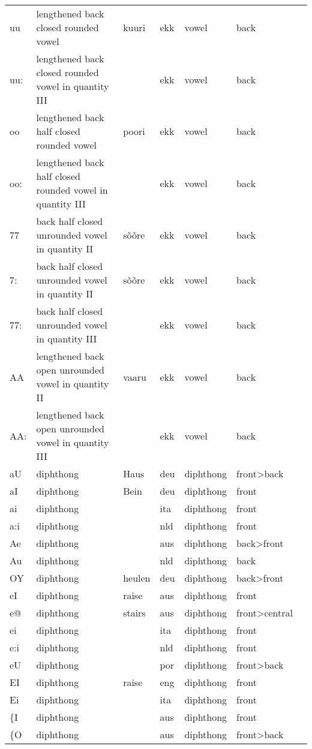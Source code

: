 \begin{longtable}{l|p{.3\linewidth}|p{.15\linewidth}|l|l|l|l}
	uu	& lengthened back closed rounded vowel	& kuuri	& ekk	& vowel	& back	\\
	uu:	& lengthened back closed rounded vowel in quantity III	& 	& ekk	& vowel	& back	\\
	oo	& lengthened back half closed rounded vowel	& poori	& ekk	& vowel	& back	\\
	oo:	& lengthened back half closed rounded vowel in quantity III	& 	& ekk	& vowel	& back	\\
	77	& back half closed unrounded vowel in quantity II	& sõõre	& ekk	& vowel	& back	\\
	7:	& back half closed unrounded vowel in quantity II	& sõõre	& ekk	& vowel	& back	\\
	77:	& back half closed unrounded vowel in quantity III	& 	& ekk	& vowel	& back	\\
	AA	& lengthened back open unrounded vowel in quantity II	& vaaru	& ekk	& vowel	& back	\\
	AA:	& lengthened back open unrounded vowel in quantity III	& 	& ekk	& vowel	& back	\\
	aU	& diphthong	& Haus	& deu	& diphthong	& front\textgreater back	\\
	aI	& diphthong	& Bein	& deu	& diphthong	& front	\\
	ai	& diphthong	& 	& ita	& diphthong	& front	\\
	a:i	& diphthong	& 	& nld	& diphthong	& front	\\
	Ae	& diphthong	& 	& aus	& diphthong	& back\textgreater front	\\
	Au	& diphthong	& 	& nld	& diphthong	& back	\\
	OY	& diphthong	& heulen	& deu	& diphthong	& back\textgreater front	\\
	eI	& diphthong	& raise	& aus	& diphthong	& front	\\
	e@	& diphthong	& stairs	& aus	& diphthong	& front\textgreater central	\\
	ei	& diphthong	& 	& ita	& diphthong	& front	\\
	e:i	& diphthong	& 	& nld	& diphthong	& front	\\
	eU	& diphthong	& 	& por	& diphthong	& front\textgreater back	\\
	EI	& diphthong	& raise	& eng	& diphthong	& front	\\
	Ei	& diphthong	& 	& ita	& diphthong	& front	\\
	\{I	& diphthong	& 	& aus	& diphthong	& front	\\
	\{O	& diphthong	& 	& aus	& diphthong	& front\textgreater back	\\

\end{longtable}
